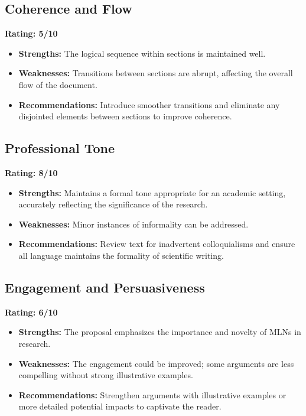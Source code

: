 \documentclass{article}
\begin{document}
\subsection{Coherence and Flow}
\textbf{Rating: 5/10}

\begin{itemize}
    \item \textbf{Strengths:} The logical sequence within sections is maintained well.
    \item \textbf{Weaknesses:} Transitions between sections are abrupt, affecting the overall flow of the document.
    \item \textbf{Recommendations:} Introduce smoother transitions and eliminate any disjointed elements between sections to improve coherence.
\end{itemize}

\subsection{Professional Tone}
\textbf{Rating: 8/10}

\begin{itemize}
    \item \textbf{Strengths:} Maintains a formal tone appropriate for an academic setting, accurately reflecting the significance of the research.
    \item \textbf{Weaknesses:} Minor instances of informality can be addressed.
    \item \textbf{Recommendations:} Review text for inadvertent colloquialisms and ensure all language maintains the formality of scientific writing.
\end{itemize}

\subsection{Engagement and Persuasiveness}
\textbf{Rating: 6/10}

\begin{itemize}
    \item \textbf{Strengths:} The proposal emphasizes the importance and novelty of MLNs in research.
    \item \textbf{Weaknesses:} The engagement could be improved; some arguments are less compelling without strong illustrative examples.
    \item \textbf{Recommendations:} Strengthen arguments with illustrative examples or more detailed potential impacts to captivate the reader.
\end{itemize}
\end{document}
